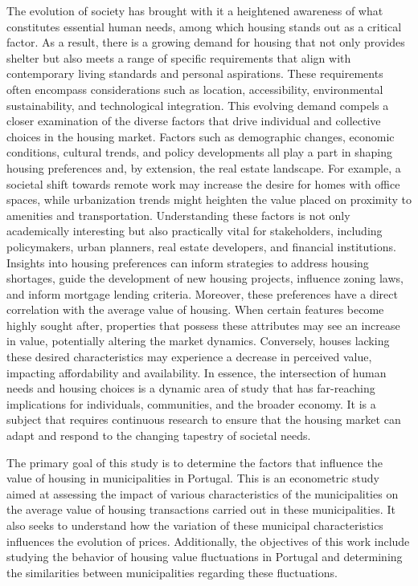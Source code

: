 \documentclass{aip-cp}
\begin{document}
The evolution of society has brought with it a heightened awareness of what constitutes essential human needs, among which housing stands out as a critical factor. As a result, there is a growing demand for housing that not only provides shelter but also meets a range of specific requirements that align with contemporary living standards and personal aspirations. These requirements often encompass considerations such as location, accessibility, environmental sustainability, and technological integration.
This evolving demand compels a closer examination of the diverse factors that drive individual and collective choices in the housing market. Factors such as demographic changes, economic conditions, cultural trends, and policy developments all play a part in shaping housing preferences and, by extension, the real estate landscape. For example, a societal shift towards remote work may increase the desire for homes with office spaces, while urbanization trends might heighten the value placed on proximity to amenities and transportation.
Understanding these factors is not only academically interesting but also practically vital for stakeholders, including policymakers, urban planners, real estate developers, and financial institutions. Insights into housing preferences can inform strategies to address housing shortages, guide the development of new housing projects, influence zoning laws, and inform mortgage lending criteria.
Moreover, these preferences have a direct correlation with the average value of housing. When certain features become highly sought after, properties that possess these attributes may see an increase in value, potentially altering the market dynamics. Conversely, houses lacking these desired characteristics may experience a decrease in perceived value, impacting affordability and availability.
In essence, the intersection of human needs and housing choices is a dynamic area of study that has far-reaching implications for individuals, communities, and the broader economy. It is a subject that requires continuous research to ensure that the housing market can adapt and respond to the changing tapestry of societal needs.

The primary goal of this study is to determine the factors that influence the value of housing in municipalities in Portugal. This is an econometric study aimed at assessing the impact of various characteristics of the municipalities on the average value of housing transactions carried out in these municipalities. It also seeks to understand how the variation of these municipal characteristics influences the evolution of prices. Additionally, the objectives of this work include studying the behavior of housing value fluctuations in Portugal and determining the similarities between municipalities regarding these fluctuations.
\end{document}
